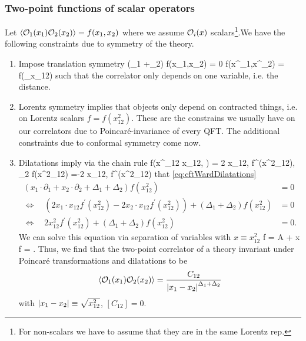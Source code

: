 \subsubsection{Two-point functions of scalar operators}
Let $\expval{\mathcal{O}_1(x_1)\mathcal{O}_2(x_2)}=f(x_1,x_2)$ where we assume $\mathcal{O}_i(x)$ scalars\footnote{For non-scalars we have to assume that they are in the same Lorentz rep.}.We have the following constraints due to symmetry of the theory.

\begin{enumerate}
	\item Impose translation symmetry
	\bse 
	(\partial_1 +\partial_2) f(x_1,x_2) = 0 \; \Rightarrow f(x^\mu_1,x^\mu_2) = f(_{\equiv x_{12}}) 
	\ese 
	such that the correlator only depends on one variable, i.e. the distance.
	\item 
	Lorentz symmetry implies that objects only depend on contracted things, i.e. on Lorentz scalars $f=f(x^2_{12})$.
	These are the constrains we usually have on our correlators due to Poincaré-invariance of every QFT. The additional constraints due to conformal symmetry come now.
	\item Dilatations imply 
	via the chain rule
	\bse 
	 f(x^\mu_{12} x_{12,\mu} ) = 2 x_{12,\mu} f^\prime(x^2_{12}), \; \partial_2 f(x^2_{12}) =-2 x_{12,\mu} f^\prime(x^2_{12}) 
	\ese 
	that \ref{eq:cftWardDilatations}
		\begin{align*}  
		\left(x_1 \cdot \partial_1 + x_2 \cdot \partial_2 + \Delta_1 + \Delta_2 \right) f(x^2_{12}) &= 0 \\
		\Leftrightarrow \quad (2 x_1 \cdot x_{12} f^\prime (x^2_{12}) - 2 x_2 \cdot x_{12} f^\prime (x^2_{12})) + (\Delta_1+\Delta_2) f(x^2_{12}) &=0 \\
		\Leftrightarrow\quad 2 x^2_{12} f^\prime(x^2_{12}) +(\Delta_1 +  \Delta_2) f(x^2_{12}) &=0.
	\end{align*}
	We can solve this equation via separation of variables with $x\equiv x^2_{12}$ 
	\bse 
	\ln f = A +  \ln x \; \Rightarrow \; f = .
	\ese 
	Thus, we find that the two-point correlator of a theory invariant under Poincaré transformations and dilatations to be
	\begin{equation}
	\label{eq:cftCorrelatorTwoPoint1}
	\expval{\mathcal{O}_1(x_1) \mathcal{O}_2(x_2)} = \frac{C_{12}}{\abs{x_1 - x_2}^{\Delta_1+\Delta_2} }
	\end{equation}
	with $\abs{x_1-x_2}\equiv \sqrt{x^2_{12}}$, $[C_{12}]=0$.	

\end{enumerate}
